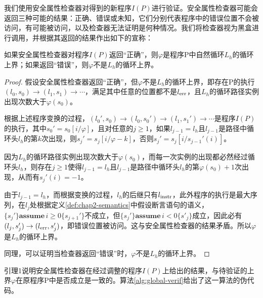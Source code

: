 我们使用安全属性检查器对得到的新程序$I
(P)$进行验证。安全属性检查器可能会返回三种可能的结果：正确、错误或未知，它们分别代表程序中的错误位置不会被访问，有可能被访问，以及检查器无法证明是何种情况。我们将检查器视为黑盒进行调用，并根据其返回的结果作出如下的宣称：

\begin{lemma}
  如果安全属性检查器对程序$I
  (P)$返回“正确”，则$\varphi$是程序P中自然循环$L_h$的循环上界；如果返回“错误”，则$\varphi$不是$L_h$的循环上界。
\end{lemma}

\begin{proof}
  
  假设安全属性检查器返回“正确”，但$\varphi$不是$L_h$的循环上界，即存在P的执行$(l_0,
  s_0) \rightarrow (l_1, s_1) \rightarrow
  \cdots$，满足其中任意的位置都不是$l_{\operatorname{err}}$，且$L_h$的循环路径实例出现次数大于$\varphi
  (s_0)$。
  
  根据上述程序变换的过程，$(l_0', s_0) \rightarrow (l_0, s_0')
  \rightarrow (l_1, s_1') \rightarrow \cdots$是程序$I
  (P)$的执行，其中$s_0' = s_0 [i / \varphi]$，且对任意的$j
  \geqslant 1$，如果$l_{j - 1} = l_h$且$l_{j -
  1}$是路径中循环头$l_h$的第$k$次出现，则$s_j' = s_j [i /
  \varphi - k]$，否则$s_j' = s_j [i / s_{j - 1}' (i)]$。
  
  因为$L_h$的循环路径实例出现次数大于$\varphi
  (s_0)$，而每一次实例的出现都必然经过循环头$l_h$，则存在$j
  \geqslant 1$使得$l_{j - 1} = l_h$且$l_{j -
  1}$是路径中循环头$l_h$的第$\varphi (s_0) +
  1$次出现，从而有$s_j' (i) = - 1$。
  
  由于$l_{j - 1} =
  l_h$，而根据变换的过程，$l_h$的后继只有$l_{\operatorname{instr}}$，此外程序的执行是最大序列，在$l_j$处根据定义\ref{def:chap2-semantics}中假设断言语句的语义，$\{
  s_j' \} \textbf{assume} \, i \geqslant 0 \{ s_{j + 1}'
  \}$不成立，但$\{ s_j' \} \textbf{assume} \, i < 0 \{ s'_j
  \}$成立，因此必有$(l_j, s_j') \rightarrow (l_{\operatorname{err}},
  s_j')$，即错误位置被访问。这与安全属性检查器的结果矛盾。所以$\varphi$是$L_h$的循环上界。
  
  同理，可以证明当检查器返回“错误”时，$\varphi$不是$L_h$的循环上界。
\end{proof}

引理1说明安全属性检查器在经过调整的程序$I
(P)$上给出的结果，与待验证的上界$\varphi$在原程序P中是否成立是一致的。算法\ref{alg:global-verif}给出了这一算法的伪代码。

